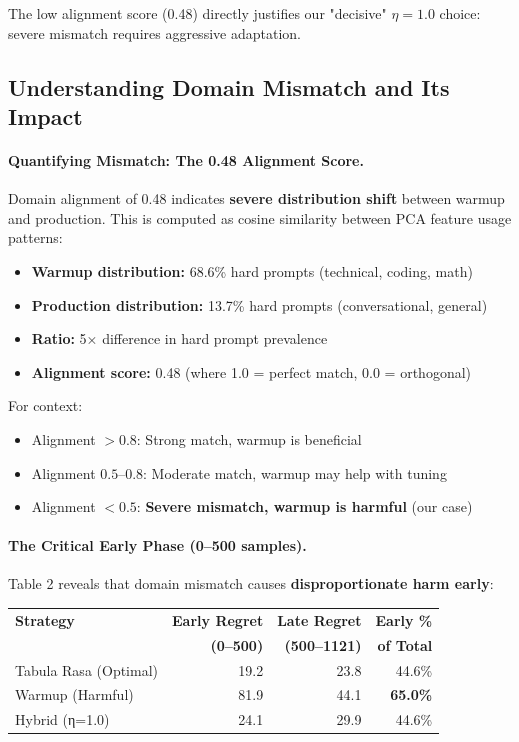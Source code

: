 The low alignment score (0.48) directly justifies our "decisive" $\eta=1.0$ choice: severe mismatch requires aggressive adaptation.

\subsection{Understanding Domain Mismatch and Its Impact}

\paragraph{Quantifying Mismatch: The 0.48 Alignment Score.}
Domain alignment of 0.48 indicates \textbf{severe distribution shift} between warmup and production. This is computed as cosine similarity between PCA feature usage patterns:

\begin{itemize}[leftmargin=*,nosep]
    \item \textbf{Warmup distribution:} 68.6\% hard prompts (technical, coding, math)
    \item \textbf{Production distribution:} 13.7\% hard prompts (conversational, general)
    \item \textbf{Ratio:} 5× difference in hard prompt prevalence
    \item \textbf{Alignment score:} 0.48 (where 1.0 = perfect match, 0.0 = orthogonal)
\end{itemize}

For context:
\begin{itemize}[leftmargin=*,nosep]
    \item Alignment $>0.8$: Strong match, warmup is beneficial
    \item Alignment $0.5$--$0.8$: Moderate match, warmup may help with tuning
    \item Alignment $<0.5$: \textbf{Severe mismatch, warmup is harmful} (our case)
\end{itemize}

\paragraph{The Critical Early Phase (0--500 samples).}
Table 2 reveals that domain mismatch causes \textbf{disproportionate harm early}:

\vspace{0.5em}
\begin{center}
\small
\begin{tabular}{@{}lrrr@{}}
\toprule
\textbf{Strategy} & \textbf{Early Regret} & \textbf{Late Regret} & \textbf{Early \%} \\
 & \textbf{(0--500)} & \textbf{(500--1121)} & \textbf{of Total} \\
\midrule
Tabula Rasa (Optimal) & 19.2 & 23.8 & 44.6\% \\
Warmup (Harmful) & 81.9 & 44.1 & \textbf{65.0\%} \\
Hybrid (η=1.0) & 24.1 & 29.9 & 44.6\% \\
\bottomrule
\end{tabular}
\end{center}
\vspace{0.5em}


